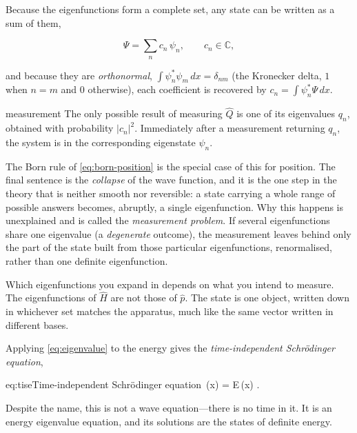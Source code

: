        Because the eigenfunctions form a complete set, any state can be written as a sum of them,

        \begin{equation}\label{eq:expansion}
            \Psi = \sum_{n}c_{n}\,\psi_{n}, \qquad c_{n} \in \mathbb{C},
        \end{equation}

        and because they are \emph{orthonormal}, $\int\psi_{n}^{*}\psi_{m}\,dx = \delta_{nm}$ (the Kronecker delta, $1$ when $n=m$ and $0$ otherwise), each coefficient is recovered by $c_{n} = \int\psi_{n}^{*}\Psi\,dx$.

        \begin{postulate}{measurement}
            \label{post:measurement}
            The only possible result of measuring $\hat{Q}$ is one of its eigenvalues $q_{n}$, obtained with probability $|c_{n}|^{2}$. Immediately after a measurement returning $q_{n}$, the system is in the corresponding eigenstate $\psi_{n}$.
        \end{postulate}

        The Born rule of \cref{eq:born-position} is the special case of this for position. The final sentence is the \emph{collapse} of the wave function, and it is the one step in the theory that is neither smooth nor reversible: a state carrying a whole range of possible answers becomes, abruptly, a single eigenfunction. Why this happens is unexplained and is called the \emph{measurement problem}. If several eigenfunctions share one eigenvalue (a \emph{degenerate} outcome), the measurement leaves behind only the part of the state built from those particular eigenfunctions, renormalised, rather than one definite eigenfunction.

        Which eigenfunctions you expand in depends on what you intend to measure. The eigenfunctions of $\hat{H}$ are not those of $\hat{p}$. The state is one object, written down in whichever set matches the apparatus, much like the same vector written in different bases.

        Applying \cref{eq:eigenvalue} to the energy gives the \emph{time-independent Schrödinger equation},

        \begin{keyeq}{eq:tise}{Time-independent Schrödinger equation}
            \,\psi(x) = E\,\psi(x) .
        \end{keyeq}

        Despite the name, this is not a wave equation---there is no time in it. It is an energy eigenvalue equation, and its solutions are the states of definite energy.

